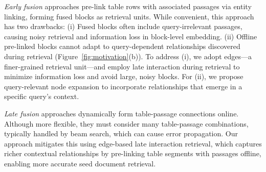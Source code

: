\emph{Early fusion} approaches \citep{OTT-QA, OTTeR, DoTTeR} pre-link table rows with associated passages via entity linking, forming fused blocks as retrieval units.
While convenient, this approach has two drawbacks:
(i) Fused blocks often include query-irrelevant passages, causing noisy retrieval and information loss in block-level embedding. 
(ii) Offline pre-linked blocks cannot adapt to query-dependent relationships discovered during retrieval (Figure~\ref{fig:motivation}(b)).
To address (i), we adopt edges—a finer-grained retrieval unit—and employ late interaction during retrieval to minimize information loss and avoid large, noisy blocks. 
For (ii), we propose query-relevant node expansion to incorporate relationships that emerge in a specific query's context.

\emph{Late fusion} approaches \citep{CORE, COS} dynamically form table-passage connections online. 
Although more flexible, they must consider many table-passage combinations, typically handled by beam search, which can cause error propagation.
Our approach mitigates this using edge-based late interaction retrieval, which captures richer contextual relationships by pre-linking table segments with passages offline, enabling more accurate seed document retrieval.


